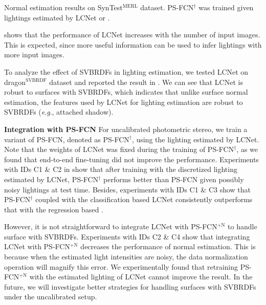 \documentclass[10pt,journal,compsoc]{IEEEtran}
\newcommand{\eg}{\textit{e}.\textit{g}.}
\newcommand{\rev}[1]{#1}
\renewcommand{\paragraph}[1]{\vspace{0.2em}\noindent \textbf{#1 \hspace{0.2em}}}
\begin{document}
\begin{table}[t] \centering
    \caption{Normal estimation results on SynTest$^\text{MERL}$ dataset. PS-FCN$^{\dag}$ was trained given lightings estimated by LCNet or \LCNetreg.} %
     \label{tab:quant_normal_syn}
\end{table}


 shows that the performance of LCNet increases with the number of input images. This is expected, since more useful information can be used to infer lightings with more input images.

To analyze the effect of SVBRDFs in lighting estimation, we tested LCNet on {\sc dragon}$^{\text{SVBRDF}}$ dataset and reported the result in .
We can see that LCNet is robust to surfaces with SVBRDFs, which indicates that unlike surface normal estimation, the features used by LCNet for lighting estimation are robust to SVBRDFs (\eg, attached shadow).

\paragraph{Integration with PS-FCN}
For uncalibrated photometric stereo, we train a variant of PS-FCN, denoted as PS-FCN$^\dag$, using the lighting estimated by LCNet. Note that the weights of LCNet was fixed during the training of PS-FCN$^\dag$, as we found that end-to-end fine-tuning did not improve the performance.  
Experiments with IDs C1 \& C2 in  show that after training with the discretized lighting estimated by LCNet, PS-FCN$^\dag$ performs better than PS-FCN given possibly noisy lightings at test time. Besides, experiments with IDs C1 \& C3 show that PS-FCN$^\dag$ coupled with the classification based LCNet consistently outperforms that with the regression based \LCNetreg. 

\rev{However, it is not straightforward to integrate LCNet with PS-FCN$^{+\text{N}}$ to handle surface with SVBRDFs. Experiments with IDs C2 \& C4 show that integrating LCNet with PS-FCN$^{+\text{N}}$ decreases the performance of normal estimation.}
This is because when the estimated light intensities are noisy, the data normalization operation will magnify this error. We experimentally found that retraining PS-FCN$^{+\text{N}}$ with the estimated lighting of LCNet cannot improve the result.
\rev{In the future, we will investigate better strategies for handling surfaces with SVBRDFs under the uncalibrated setup.}
\end{document}
